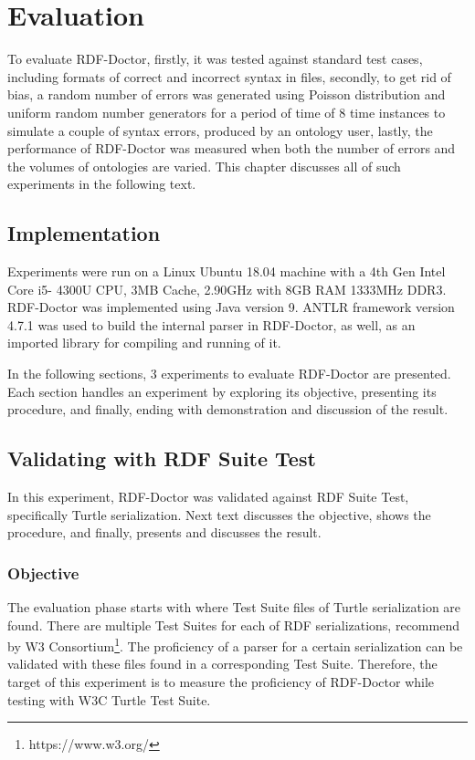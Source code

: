 \chapter{Evaluation}
\label{ch:evaluation}
To evaluate RDF-Doctor, firstly, it was tested against standard test cases, including formats of correct and incorrect syntax in files, secondly, to get rid of bias, a random number of errors was generated using Poisson distribution and uniform random number generators for a period of time of 8 time instances to simulate a couple of syntax errors, produced by an ontology user, lastly, the performance of RDF-Doctor was measured when both the number of errors and the volumes of ontologies are varied. This chapter discusses all of such experiments in the following text. 
\section{Implementation}
Experiments were run on a Linux
Ubuntu 18.04 machine with a 4th Gen Intel Core i5-
4300U CPU, 3MB Cache, 2.90GHz with 8GB RAM
1333MHz DDR3. RDF-Doctor was implemented using
Java version 9. ANTLR framework version 4.7.1 was used to build the internal parser in RDF-Doctor, as well, as an imported library for compiling and running of it.  

In the following sections, 3 experiments to evaluate RDF-Doctor are presented. Each section handles an experiment by exploring its objective, presenting its procedure, and finally, ending with demonstration and discussion of the  result.   

\section{Validating with RDF Suite Test} In this experiment, RDF-Doctor was validated against RDF Suite Test, specifically Turtle serialization. Next text discusses the objective, shows the procedure, and finally, presents and discusses the result.     
\subsection{Objective}
The evaluation phase starts with \cite{TurtleTests:Online} where Test Suite files of Turtle serialization are found. There are multiple Test Suites for each of RDF serializations, recommend by W3 Consortium\footnote{https://www.w3.org/}. The proficiency of a parser for a certain serialization can be validated with these files found in a corresponding Test Suite. Therefore, the target of this experiment is to measure the proficiency of RDF-Doctor while testing with W3C Turtle Test Suite.

